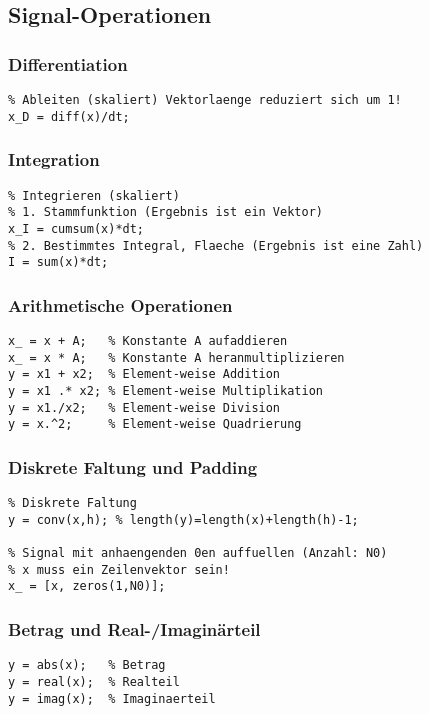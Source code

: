 \documentclass[threecolumn, 5pt, german]{latex4ei/latex4ei_sheet}
\begin{document}
	\begin{sectionbox}
	
		\subsection{Signal-Operationen}
		
		\subsubsection{Differentiation}
		
		\begin{lstlisting}
% Ableiten (skaliert) Vektorlaenge reduziert sich um 1!
x_D = diff(x)/dt;
		\end{lstlisting}

		\subsubsection{Integration}
		
		\begin{lstlisting}
% Integrieren (skaliert)
% 1. Stammfunktion (Ergebnis ist ein Vektor)
x_I = cumsum(x)*dt;
% 2. Bestimmtes Integral, Flaeche (Ergebnis ist eine Zahl)
I = sum(x)*dt;
		\end{lstlisting}

		\subsubsection{Arithmetische Operationen}
		
		\begin{lstlisting}
x_ = x + A;   % Konstante A aufaddieren
x_ = x * A;   % Konstante A heranmultiplizieren
y = x1 + x2;  % Element-weise Addition
y = x1 .* x2; % Element-weise Multiplikation
y = x1./x2;   % Element-weise Division
y = x.^2;     % Element-weise Quadrierung
		\end{lstlisting}

		\subsubsection{Diskrete Faltung und Padding}
		
		\begin{lstlisting}
% Diskrete Faltung
y = conv(x,h); % length(y)=length(x)+length(h)-1;

% Signal mit anhaengenden 0en auffuellen (Anzahl: N0)
% x muss ein Zeilenvektor sein!
x_ = [x, zeros(1,N0)];
		\end{lstlisting}

		\subsubsection{Betrag und Real-/Imaginärteil}
		\begin{lstlisting}
y = abs(x);   % Betrag
y = real(x);  % Realteil
y = imag(x);  % Imaginaerteil
		\end{lstlisting}
	\end{sectionbox}
	
\end{document}
